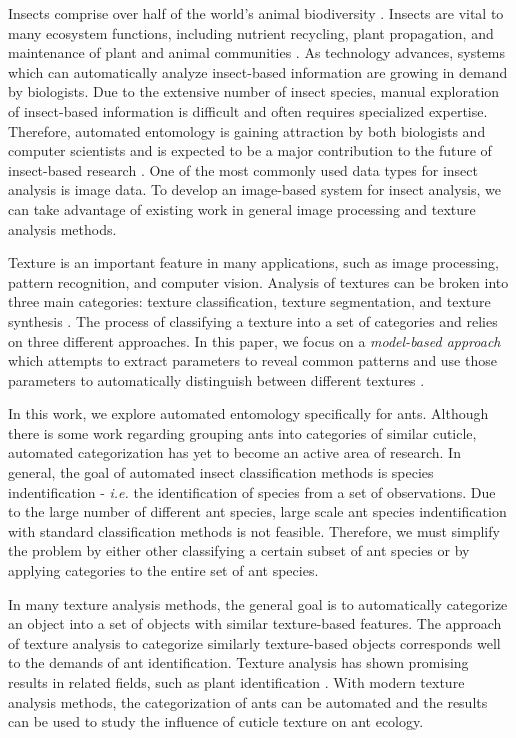 \documentclass[12pt]{article}
\begin{document}
Insects comprise over half of the world's animal biodiversity
\cite{tihelka_evolution_2021}. Insects are vital to many ecosystem functions,
including nutrient recycling, plant propagation, and maintenance of plant and
animal communities \cite{gullan_insects_2009, berenbaum_bugs_1996}. As technology
advances, systems which can automatically analyze insect-based information are
growing in demand by biologists. Due to the extensive number of insect species,
manual exploration of insect-based information is difficult and often requires
specialized expertise. Therefore, automated entomology is gaining attraction by
both biologists and computer scientists and is expected to be a major
contribution to the future of insect-based research
\cite{martineau_survey_2017}. One of the most commonly used data types for
insect analysis is image data. To develop an image-based system for insect
analysis, we can take advantage of existing work in general image processing and
texture analysis methods.

Texture is an important feature in many applications, such as image processing,
pattern recognition, and computer vision. Analysis of textures can be broken
into three main categories: texture classification, texture segmentation, and
texture synthesis \cite{reed_review_1993}. The process of classifying a texture
into a set of categories and relies on three different approaches. In this
paper, we focus on a \textit{model-based approach} which attempts to extract
parameters to reveal common patterns and use those parameters to automatically
distinguish between different textures \cite{maillard_texture_2003}.

In this work, we explore automated entomology specifically for ants. Although
there is some work regarding grouping ants into categories of similar cuticle,
automated categorization has yet to become an active area of research. In
general, the goal of automated insect classification methods is species
indentification - \textit{i.e.} the identification of species from a set of
observations. Due to the large number of different ant species, large scale ant
species indentification with standard classification methods is not feasible.
Therefore, we must simplify the problem by either other classifying a certain
subset of ant species or by applying categories to the entire set of ant
species.

In many texture analysis methods, the general goal is to automatically
categorize an object into a set of objects with similar texture-based features.
The approach of texture analysis to categorize similarly texture-based objects
corresponds well to the demands of ant identification. Texture analysis has
shown promising results in related fields, such as plant identification
\cite{boudra_plant_2018}. With modern texture analysis methods, the
categorization of ants can be automated and the results can be used to study the
influence of cuticle texture on ant ecology.
\end{document}
